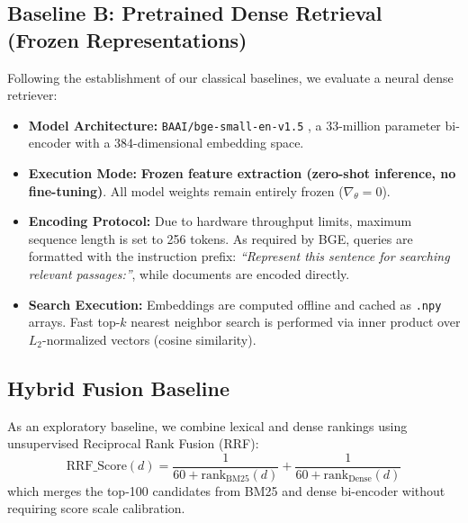 \subsection{Baseline B: Pretrained Dense Retrieval (Frozen Representations)}
Following the establishment of our classical baselines, we evaluate a neural dense retriever:
\begin{itemize}
    \item \textbf{Model Architecture:} \texttt{BAAI/bge-small-en-v1.5} \cite{bge_models}, a 33-million parameter bi-encoder with a 384-dimensional embedding space.
    \item \textbf{Execution Mode:} \textbf{Frozen feature extraction (zero-shot inference, no fine-tuning)}. All model weights remain entirely frozen ($\nabla_\theta = 0$).
    \item \textbf{Encoding Protocol:} Due to hardware throughput limits, maximum sequence length is set to 256 tokens. As required by BGE, queries are formatted with the instruction prefix: \textit{``Represent this sentence for searching relevant passages:''}, while documents are encoded directly.
    \item \textbf{Search Execution:} Embeddings are computed offline and cached as \texttt{.npy} arrays. Fast top-$k$ nearest neighbor search is performed via inner product over $L_2$-normalized vectors (cosine similarity).
\end{itemize}

\subsection{Hybrid Fusion Baseline}
As an exploratory baseline, we combine lexical and dense rankings using unsupervised Reciprocal Rank Fusion (RRF):
\begin{equation}
    \text{RRF\_Score}(d) = \frac{1}{60 + \text{rank}_{\text{BM25}}(d)} + \frac{1}{60 + \text{rank}_{\text{Dense}}(d)}
\end{equation}
which merges the top-100 candidates from BM25 and dense bi-encoder without requiring score scale calibration.
